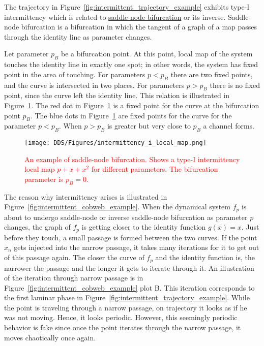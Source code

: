 The trajectory in Figure~\ref{fig:intermittent_trajectory_example} exhibits type-I intermittency which is related to \hyperref[def:saddle_node_bif]{saddle-node bifurcation} or its inverse.
Saddle-node bifurcation is a bifurcation in which the tangent of a graph of a map passes through the identity line as parameter changes.
\par
Let parameter $p_{B}$ be a bifurcation point.
At this point, local map of the system touches the identity line in exactly one spot; in other words, the system has fixed point in the area of touching.
For parameters $p < p_{B}$ there are two fixed points, and the curve is intersected in two places.
For parameters $p > p_{B}$ there is no fixed point, since the curve left the identity line.
This relation is illustrated in Figure~\ref{fig:saddle_node_bifurcation}.
The red dot in Figure~\ref{fig:saddle_node_bifurcation} is a fixed point for the curve at the bifurcation point $p_{B}$.
The blue dots in Figure~\ref{fig:saddle_node_bifurcation} are fixed points for the curve for the parameter $p < p_{B}$.
When $p > p_{B}$ is greater but very close to $p_{B}$ a channel forms.
\begin{figure}[!h]
    \centering
    \texttt{[image: DDS/Figures/intermittency\_i\_local\_map.png]}
    \caption{
        \textcolor{red}{
        An example of saddle-node bifurcation. 
        Shows a type-I intermittency local map $p + x + x^2$ for different parameters. 
        The bifurcation parameter is $p_B = 0$.
        }
    }
    \label{fig:saddle_node_bifurcation}
\end{figure}


The reason why intermittency arises is illustrated in Figure~\ref{fig:intermittent_cobweb_example}.
When the dynamical system $f_p$ is about to undergo saddle-node or inverse saddle-node bifurcation as parameter $p$ changes, the graph of $f_p$ is getting closer to the identity function $g(x)=x$.
Just before they touch, a small passage is formed between the two curves.
If the point $x_n$ gets injected into the narrow passage, it takes many iterations for it to get out of this passage again.
The closer the curve of $f_p$ and the identity function is, the narrower the passage and the longer it gets to iterate through it.
An illustration of the iteration through narrow passage is in Figure~\ref{fig:intermittent_cobweb_example} plot B.
This iteration corresponds to the first laminar phase in Figure~\ref{fig:intermittent_trajectory_example}.
While the point is traveling through a narrow passage, on trajectory it looks as if he was not moving.
Hence, it looks periodic.
However, this seemingly periodic behavior is fake since once the point iterates through the narrow passage, it moves chaotically once again.

